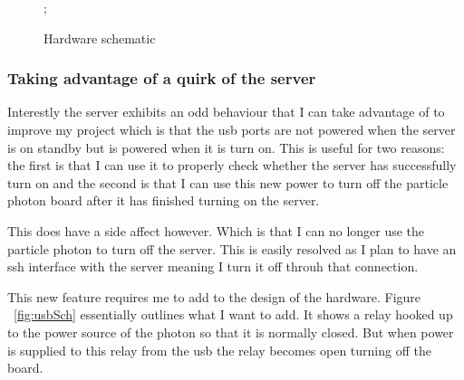 \documentclass{article}
\begin{document}
\begin{figure}[H]
    \noindent{};
    \caption{Hardware schematic} \label{fig:turnOnRelay}
\end{figure}


\subsubsection{Taking advantage of a quirk of the server}
Interestly the server exhibits an odd behaviour that I can take advantage of to improve my
project which is that the usb ports are not powered when the server is on standby but is powered
when it is turn on. This is useful for two reasons: the first is that I can use it to properly
check whether the server has successfully turn on and the second is that I can use this new
power to turn off the particle photon board after it has finished turning on the server.

This does have a side affect however. Which is that I can no longer use the particle
photon to turn off the server. This is easily resolved as I plan to have an ssh interface
with the server meaning I turn it off throuh that connection.

This new feature requires me to add to the design of the hardware. Figure ~\ref{fig:usbSch}
essentially outlines what I want to add. It shows a relay hooked up to the power source of
the photon so that it is normally closed. But when power is supplied to this relay from the
usb the relay becomes open turning off the board.
\end{document}
